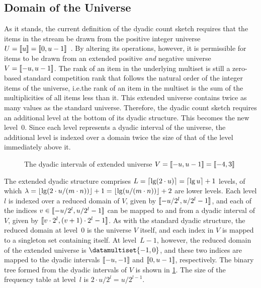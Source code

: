 \subsection{Domain of the Universe}
\label{subsec:dyadic-count-sketch-analysis-universe}

As it stands, the current definition of the dyadic count sketch requires that the items in the stream be drawn from the positive integer universe \( U = \llbracket u\rrbracket = \llbracket0, u - 1\rrbracket \)~\citep{cormode20}.
By altering its operations, however, it is permissible for items to be drawn from an extended positive \emph{and} negative universe \( V = \llbracket-u, u - 1\rrbracket \).
The rank of an item in the underlying multiset is still a zero-based standard competition rank that follows the natural order of the integer items of the universe, i.e.\@ the rank of an item in the multiset is the sum of the multiplicities of all items less than it.
This extended universe contains twice as many values as the standard universe.
Therefore, the dyadic count sketch requires an additional level at the bottom of its dyadic structure.
This becomes the new level~\( 0 \).
Since each level represents a dyadic interval of the universe, the additional level is indexed over a domain twice the size of that of the level immediately above it.

\begin{figure}
  \centering
  \caption{The dyadic intervals of extended universe \( V = \llbracket-u, u - 1\rrbracket = \llbracket-4, 3\rrbracket \)}
  \label{fig:dyadic-count-sketch-analysis-universe-extended-binary-tree}
\end{figure}

The extended dyadic structure comprises \( L = \lceil\lg (2 \cdot u)\rceil = \lceil\lg u\rceil + 1 \) levels, of which \( \lambda = \lfloor\lg (2 \cdot u / (m \cdot n))\rfloor + 1 = \lfloor\lg (u / (m \cdot n))\rfloor + 2 \) are lower levels.
Each level \( l \) is indexed over a reduced domain of \( V \), given by \( \llbracket-u / 2^{l}, u / 2^{l} - 1\rrbracket \), and each of the indices \( v \in \llbracket-u / 2^{l}, u / 2^{l} - 1\rrbracket \) can be mapped to and from a dyadic interval of \( V \), given by \( \llbracket v \cdot 2^{l}, (v + 1) \cdot 2^{l} - 1\rrbracket \).
As with the standard dyadic structure, the reduced domain at level~\( 0 \) is the universe \( V \) itself, and each index in \( V \) is mapped to a singleton set containing itself.
At level~\( L - 1 \), however, the reduced domain of the extended universe is \( \datamultiset{-1, 0} \), and these two indices are mapped to the dyadic intervals \( \llbracket-u, -1\rrbracket \) and \( \llbracket0, u - 1\rrbracket \), respectively.
The binary tree formed from the dyadic intervals of \( V \) is shown in \cref{fig:dyadic-count-sketch-analysis-universe-extended-binary-tree}.
The size of the frequency table at level~\( l \) is \( 2 \cdot u / 2^{l} = u / 2^{l - 1} \).

